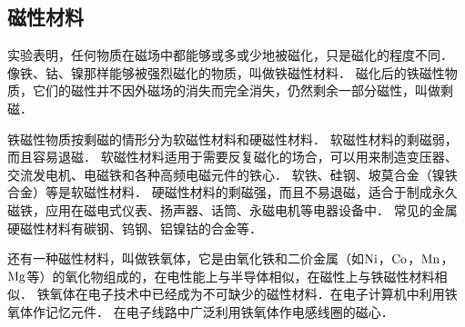 \subsection{磁性材料}

实验表明，任何物质在磁场中都能够或多或少地被磁化，只是磁化的程度不同．
像铁、钴、镍那样能够被强烈磁化的物质，叫做铁磁性材料．
磁化后的铁磁性物质，它们的磁性并不因外磁场的消失而完全消失，仍然剩余一部分磁性，叫做剩磁．

铁磁性物质按剩磁的情形分为软磁性材料和硬磁性材料．
软磁性材料的剩磁弱，而且容易退磁．
软磁性材料适用于需要反复磁化的场合，可以用来制造变压器、交流发电机、电磁铁和各种高频电磁元件的铁心．
软铁、硅钢、坡莫合金（镍铁合金）等是软磁性材料．
硬磁性材料的剩磁强，而且不易退磁，适合于制成永久磁铁，应用在磁电式仪表、扬声器、话筒、永磁电机等电器设备中．
常见的金属硬磁性材料有碳钢、钨钢、铝镍钴的合金等．

还有一种磁性材料，叫做铁氧体，它是由氧化铁和二价金属（如$ \rm{Ni} $，$ \rm{Co} $，$ \rm{Mn} $，$ \rm{Mg} $等）的氧化物组成的，在电性能上与半导体相似，在磁性上与铁磁性材料相似．
铁氧体在电子技术中已经成为不可缺少的磁性材料．在电子计算机中利用铁氧体作记忆元件．
在电子线路中广泛利用铁氧体作电感线圈的磁心．

